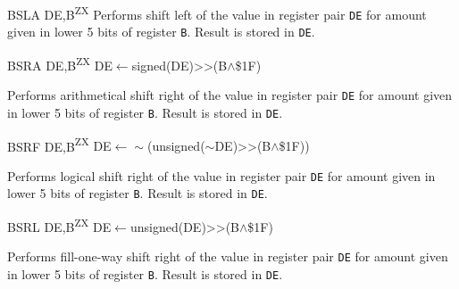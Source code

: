 \documentclass[12pt,twoside,openright,a4paper]{book}
\newcommand{\ZXN}{\textnormal{\textsuperscript{ZX}}}
\begin{document}
\begin{basedescript}{
	\desclabelstyle{\multilinelabel}
	\desclabelwidth{3cm}}
\begin{detailitem}{BSLA DE,B\ZXN}
		Performs shift left of the value in register pair {\tt DE} for amount given in lower 5 bits of register {\tt B}. Result is stored in {\tt DE}.

		\DetailNoEffect
		
		\begin{DetailTiming}
		\end{DetailTiming}

	\end{detailitem}

	\begin{detailitem}{BSRA DE,B\ZXN}
		{DE$\leftarrow$signed(DE)>>(B$\wedge$\$1F)}

		Performs arithmetical shift right of the value in register pair {\tt DE} for amount given in lower 5 bits of register {\tt B}. Result is stored in {\tt DE}.

		\DetailNoEffect
		
		\begin{DetailTiming}
			\DetailTime{}{2}{8}
		\end{DetailTiming}

	\end{detailitem}

	\begin{detailitem}{BSRF DE,B\ZXN}
		{DE$\leftarrow\sim$(unsigned($\sim$DE)>>(B$\wedge$\$1F))}

		Performs logical shift right of the value in register pair {\tt DE} for amount given in lower 5 bits of register {\tt B}. Result is stored in {\tt DE}.

		\DetailNoEffect
		
		\begin{DetailTiming}
		\end{DetailTiming}

	\end{detailitem}

	\begin{detailitem}{BSRL DE,B\ZXN}
		{DE$\leftarrow$unsigned(DE)>>(B$\wedge$\$1F)}

		Performs fill-one-way shift right of the value in register pair {\tt DE} for amount given in lower 5 bits of register {\tt B}. Result is stored in {\tt DE}.

		\DetailNoEffect
		
		\begin{DetailTiming}
			\DetailTime{}{2}{8}
		\end{DetailTiming}

	\end{detailitem}
	

\end{basedescript}
\end{document}

